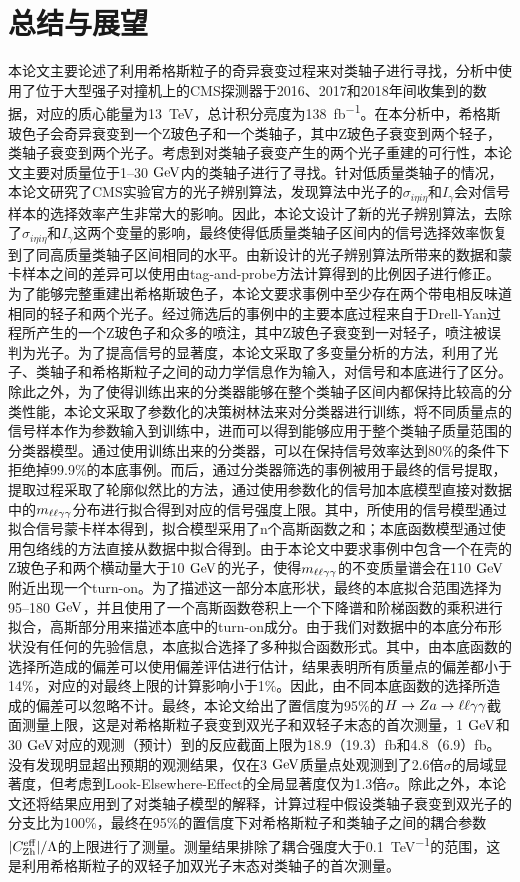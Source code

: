 
\chapter{总结与展望}

本论文主要论述了利用希格斯粒子的奇异衰变过程来对类轴子进行寻找，分析中使用了位于大型强子对撞机上的CMS探测器于2016、2017和2018年间收集到的数据，对应的质心能量为13~\si{\TeV}，总计积分亮度为138~\si{fb^{-1}}。在本分析中，希格斯玻色子会奇异衰变到一个Z玻色子和一个类轴子，其中Z玻色子衰变到两个轻子，类轴子衰变到两个光子。考虑到对类轴子衰变产生的两个光子重建的可行性，本论文主要对质量位于1--30$\GeV$内的类轴子进行了寻找。针对低质量类轴子的情况，本论文研究了CMS实验官方的光子辨别算法，发现算法中光子的$\sigma_{i\eta i\eta}$和$I_{\gamma}$会对信号样本的选择效率产生非常大的影响。因此，本论文设计了新的光子辨别算法，去除了$\sigma_{i\eta i\eta}$和$I_{\gamma}$这两个变量的影响，最终使得低质量类轴子区间内的信号选择效率恢复到了同高质量类轴子区间相同的水平。由新设计的光子辨别算法所带来的数据和蒙卡样本之间的差异可以使用由tag-and-probe方法计算得到的比例因子进行修正。为了能够完整重建出希格斯玻色子，本论文要求事例中至少存在两个带电相反味道相同的轻子和两个光子。经过筛选后的事例中的主要本底过程来自于Drell-Yan过程所产生的一个Z玻色子和众多的喷注，其中Z玻色子衰变到一对轻子，喷注被误判为光子。为了提高信号的显著度，本论文采取了多变量分析的方法，利用了光子、类轴子和希格斯粒子之间的动力学信息作为输入，对信号和本底进行了区分。除此之外，为了使得训练出来的分类器能够在整个类轴子区间内都保持比较高的分类性能，本论文采取了参数化的决策树林法来对分类器进行训练，将不同质量点的信号样本作为参数输入到训练中，进而可以得到能够应用于整个类轴子质量范围的分类器模型。通过使用训练出来的分类器，可以在保持信号效率达到80\%的条件下拒绝掉99.9\%的本底事例。而后，通过分类器筛选的事例被用于最终的信号提取，提取过程采取了轮廓似然比的方法，通过使用参数化的信号加本底模型直接对数据中的$m_{\ell\ell\gamma\gamma}$分布进行拟合得到对应的信号强度上限。其中，所使用的信号模型通过拟合信号蒙卡样本得到，拟合模型采用了n个高斯函数之和；本底函数模型通过使用包络线的方法直接从数据中拟合得到。由于本论文中要求事例中包含一个在壳的Z玻色子和两个横动量大于10$\GeV$的光子，使得$m_{\ell\ell\gamma\gamma}$的不变质量谱会在110$\GeV$附近出现一个turn-on。为了描述这一部分本底形状，最终的本底拟合范围选择为95--180$\GeV$，并且使用了一个高斯函数卷积上一个下降谱和阶梯函数的乘积进行拟合，高斯部分用来描述本底中的turn-on成分。由于我们对数据中的本底分布形状没有任何的先验信息，本底拟合选择了多种拟合函数形式。其中，由本底函数的选择所造成的偏差可以使用偏差评估进行估计，结果表明所有质量点的偏差都小于14\%，对应的对最终上限的计算影响小于1\%。因此，由不同本底函数的选择所造成的偏差可以忽略不计。最终，本论文给出了置信度为95\%的$H\to Za\to\ell\ell\gamma\gamma$截面测量上限，这是对希格斯粒子衰变到双光子和双轻子末态的首次测量，1$\GeV$和30$\GeV$对应的观测（预计）到的反应截面上限为18.9（19.3）\si{fb}和4.8（6.9）\si{fb}。没有发现明显超出预期的观测结果，仅在3$\GeV$质量点处观测到了2.6倍$\sigma$的局域显著度，但考虑到Look-Elsewhere-Effect的全局显著度仅为1.3倍$\sigma$。除此之外，本论文还将结果应用到了对类轴子模型的解释，计算过程中假设类轴子衰变到双光子的分支比为100\%，最终在95\%的置信度下对希格斯粒子和类轴子之间的耦合参数$|C_{\mathrm{Zh}}^{\mathrm{eff}}|/\Lambda$的上限进行了测量。测量结果排除了耦合强度大于0.1~\si{\TeV^{-1}}的范围，这是利用希格斯粒子的双轻子加双光子末态对类轴子的首次测量。


